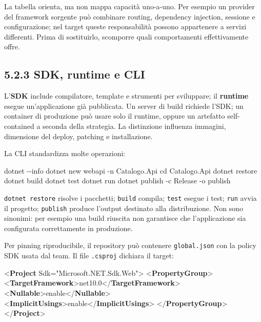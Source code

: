 \documentclass[
  italian,
  10pt,
]{book}
\newenvironment{Shaded}{\begin{snugshade}}{\end{snugshade}}
\newcommand{\KeywordTok}[1]{\textcolor[rgb]{0.13,0.29,0.53}{\textbf{#1}}}
\newcommand{\NormalTok}[1]{#1}
\newcommand{\OtherTok}[1]{\textcolor[rgb]{0.56,0.35,0.01}{#1}}
\newcommand{\StringTok}[1]{\textcolor[rgb]{0.31,0.60,0.02}{#1}}
\begin{document}
La tabella orienta, ma non mappa capacità uno-a-uno. Per esempio un
provider del framework sorgente può combinare routing, dependency
injection, sessione e configurazione; nel target queste responsabilità
possono appartenere a servizi differenti. Prima di sostituirlo,
scomporre quali comportamenti effettivamente offre.

\subsection{5.2.3 SDK, runtime e CLI}\label{sdk-runtime-e-cli}

L'\textbf{SDK} include compilatore, template e strumenti per sviluppare;
il \textbf{runtime} esegue un'applicazione già pubblicata. Un server di
build richiede l'SDK; un container di produzione può usare solo il
runtime, oppure un artefatto self-contained a seconda della strategia.
La distinzione influenza immagini, dimensione del deploy, patching e
installazione.

La CLI standardizza molte operazioni:

\begin{Shaded}
\begin{Highlighting}[]
\NormalTok{dotnet {-}{-}info}
\NormalTok{dotnet new webapi {-}n Catalogo.Api}
\NormalTok{cd Catalogo.Api}
\NormalTok{dotnet restore}
\NormalTok{dotnet build}
\NormalTok{dotnet test}
\NormalTok{dotnet run}
\NormalTok{dotnet publish {-}c Release {-}o publish}
\end{Highlighting}
\end{Shaded}

\texttt{dotnet\ restore} risolve i pacchetti; \texttt{build} compila;
\texttt{test} esegue i test; \texttt{run} avvia il progetto;
\texttt{publish} produce l'output destinato alla distribuzione. Non sono
sinonimi: per esempio una build riuscita non garantisce che
l'applicazione sia configurata correttamente in produzione.

Per pinning riproducibile, il repository può contenere
\texttt{global.json} con la policy SDK usata dal team. Il file
\texttt{.csproj} dichiara il target:

\begin{Shaded}
\begin{Highlighting}[]
\NormalTok{\textless{}}\KeywordTok{Project} \OtherTok{Sdk=}\StringTok{"Microsoft.NET.Sdk.Web"}\NormalTok{\textgreater{}}
\NormalTok{  \textless{}}\KeywordTok{PropertyGroup}\NormalTok{\textgreater{}}
\NormalTok{    \textless{}}\KeywordTok{TargetFramework}\NormalTok{\textgreater{}net10.0\textless{}/}\KeywordTok{TargetFramework}\NormalTok{\textgreater{}}
\NormalTok{    \textless{}}\KeywordTok{Nullable}\NormalTok{\textgreater{}enable\textless{}/}\KeywordTok{Nullable}\NormalTok{\textgreater{}}
\NormalTok{    \textless{}}\KeywordTok{ImplicitUsings}\NormalTok{\textgreater{}enable\textless{}/}\KeywordTok{ImplicitUsings}\NormalTok{\textgreater{}}
\NormalTok{  \textless{}/}\KeywordTok{PropertyGroup}\NormalTok{\textgreater{}}
\NormalTok{\textless{}/}\KeywordTok{Project}\NormalTok{\textgreater{}}
\end{Highlighting}
\end{Shaded}
\end{document}
